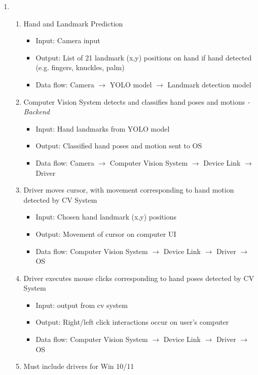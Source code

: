 \documentclass{article}
\newlength\tindent
\begin{document}
\newcommand{\req}[3]{%
\begin{itemize}%
\item Input: #1%
\item Output: #2%
\item Data flow: #3%
\end{itemize}%
}
\begin{enumerate}[label=\textbf{P\arabic*},leftmargin=\tindent,start=0]
\item ~
    \begin{enumerate}[label=Req \arabic*.,leftmargin=\tindent,align=left,labelwidth=\tindent]
    \item Hand and Landmark Prediction
    \req{Camera input}
        {List of 21 landmark (x,y) positions on hand if hand detected (e.g. fingers, knuckles, palm)}
        {Camera $\to$ YOLO model $\to$ Landmark detection model}
    \item Computer Vision System detects and classifies hand poses and motions \textit{- Backend}
    \req{Hand landmarks from YOLO model}
        {Classified hand poses and motion sent to OS}
        {Camera $\to$ Computer Vision System $\to$ Device Link $\to$ Driver}
    \item Driver moves cursor, with movement corresponding to hand motion detected by CV System
    \req{Chosen hand landmark (x,y) positions}
        {Movement of cursor on computer UI}
        {Computer Vision System $\to$ Device Link $\to$ Driver $\to$ OS}
    \item Driver executes mouse clicks corresponding to hand poses detected by CV System
    \req{output from cv system}
        {Right/left click interactions occur on user's computer}
        {Computer Vision System $\to$ Device Link $\to$ Driver $\to$ OS}
    \item Must include drivers for Win 10/11
    \end{enumerate}


\end{enumerate}
\end{document}
